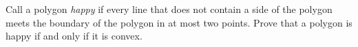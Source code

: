 Call a polygon \emph{happy} if every line that does not contain a side of the polygon meets the boundary of the polygon in at most two points. Prove that a polygon is happy if and only if it is convex.
